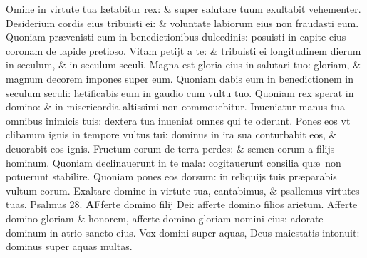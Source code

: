 \documentclass[a5paper,10pt]{book}
\def\ae{æ}
\begin{document}
\begin{multicols*}{2}
Omine in virtute tua l\ae tabitur rex: \& super salutare tuum exultabit vehementer.
\newline \color{red} D\color{black}esiderium cordis eius tribuisti ei: \& voluntate labiorum eius non fraudasti eum.
\newline \color{red} Q\color{black}uoniam pr\ae venisti eum in benedictionibus dulcedinis: posuisti in capite eius coronam de lapide pretioso.
\newline \color{red} V\color{black}itam petijt a te: \& tribuisti ei longitudinem dierum in seculum, \& in seculum seculi.
\newline \color{red} M\color{black}agna est gloria eius in salutari tuo: gloriam, \& magnum decorem impones super eum.
\newline \color{red} Q\color{black}uoniam dabis eum in benedictionem in seculum seculi: l\ae tificabis eum in gaudio cum vultu tuo.
\newline \color{red} Q\color{black}uoniam rex sperat in domino: \& in misericordia altissimi non commouebitur.
\newline \color{red} I\color{black}nueniatur manus tua omnibus inimicis tuis: dextera tua inueniat omnes qui te oderunt.
\newline \color{red} P\color{black}ones eos vt clibanum ignis in tempore vultus tui: dominus in ira sua conturbabit eos, \& deuorabit eos ignis.
\newline \color{red} F\color{black}ructum eorum de terra perdes: \& semen eorum a filijs hominum.
\newline \color{red} Q\color{black}uoniam declinauerunt in te mala: cogitauerunt consilia qu\ae \ non potuerunt stabilire.
\newline \color{red} Q\color{black}uoniam pones eos dorsum: in reliquijs tuis pr\ae parabis vultum eorum.
\newline \color{red} E\color{black}xaltare domine in virtute tua, cantabimus, \& psallemus virtutes tuas.
\newline \color{red} Psalmus \hypertarget{ps28}{28.} \color{black}
\vspace{-1em}
\lettrine[lines=2]{\bfseries \color{red} A}{}Fferte domino filij Dei: afferte domino filios arietum.
\newline \color{red} A\color{black}fferte domino gloriam \& honorem, afferte domino gloriam nomini eius: adorate dominum in atrio sancto eius.
\newline \color{red} V\color{black}ox domini super aquas, Deus maiestatis intonuit: dominus super aquas multas.

\end{multicols*}
\end{document}
